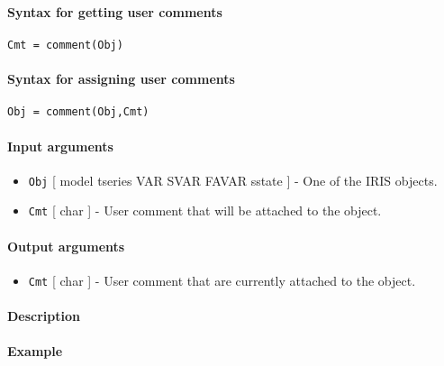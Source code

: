 


	\paragraph{Syntax for getting user
comments}\label{syntax-for-getting-user-comments}

\begin{verbatim}
Cmt = comment(Obj)
\end{verbatim}

\paragraph{Syntax for assigning user
comments}\label{syntax-for-assigning-user-comments}

\begin{verbatim}
Obj = comment(Obj,Cmt)
\end{verbatim}

\paragraph{Input arguments}\label{input-arguments}

\begin{itemize}
\item
  \texttt{Obj} {[} model \textbar{} tseries \textbar{} VAR \textbar{}
  SVAR \textbar{} FAVAR \textbar{} sstate {]} - One of the IRIS objects.
\item
  \texttt{Cmt} {[} char {]} - User comment that will be attached to the
  object.
\end{itemize}

\paragraph{Output arguments}\label{output-arguments}

\begin{itemize}
\itemsep1pt\parskip0pt
\item
  \texttt{Cmt} {[} char {]} - User comment that are currently attached
  to the object.
\end{itemize}

\paragraph{Description}\label{description}

\paragraph{Example}\label{example}


